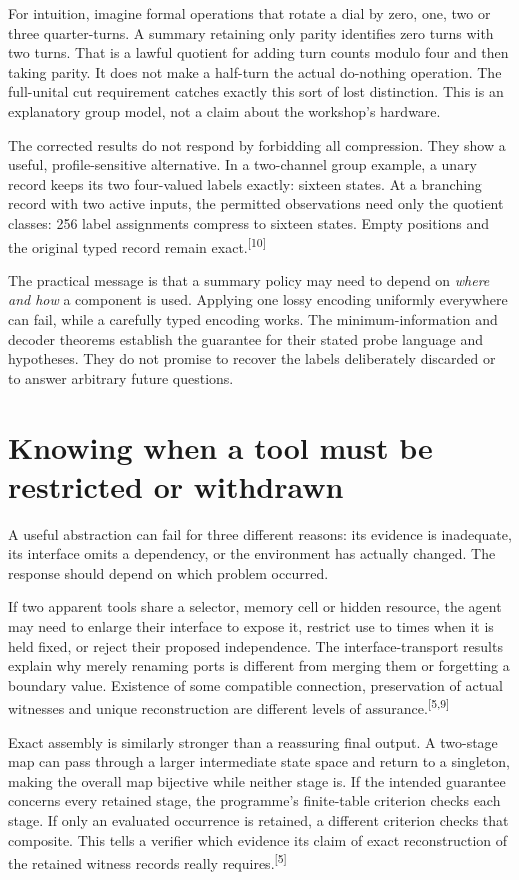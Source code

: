 \documentclass[11pt]{article}
\newcommand{\sn}[1]{\textsuperscript{[#1]}}
\begin{document}
For intuition, imagine formal operations that rotate a dial by zero, one, two or three quarter-turns. A summary retaining only parity identifies zero turns with two turns. That is a lawful quotient for adding turn counts modulo four and then taking parity. It does not make a half-turn the actual do-nothing operation. The full-unital cut requirement catches exactly this sort of lost distinction. This is an explanatory group model, not a claim about the workshop's hardware.

The corrected results do not respond by forbidding all compression. They show a useful, profile-sensitive alternative. In a two-channel group example, a unary record keeps its two four-valued labels exactly: sixteen states. At a branching record with two active inputs, the permitted observations need only the quotient classes: 256 label assignments compress to sixteen states. Empty positions and the original typed record remain exact.\sn{10}

The practical message is that a summary policy may need to depend on \emph{where and how} a component is used. Applying one lossy encoding uniformly everywhere can fail, while a carefully typed encoding works. The minimum-information and decoder theorems establish the guarantee for their stated probe language and hypotheses. They do not promise to recover the labels deliberately discarded or to answer arbitrary future questions.

\section{Knowing when a tool must be restricted or withdrawn}

A useful abstraction can fail for three different reasons: its evidence is inadequate, its interface omits a dependency, or the environment has actually changed. The response should depend on which problem occurred.

If two apparent tools share a selector, memory cell or hidden resource, the agent may need to enlarge their interface to expose it, restrict use to times when it is held fixed, or reject their proposed independence. The interface-transport results explain why merely renaming ports is different from merging them or forgetting a boundary value. Existence of some compatible connection, preservation of actual witnesses and unique reconstruction are different levels of assurance.\sn{5,9}

Exact assembly is similarly stronger than a reassuring final output. A two-stage map can pass through a larger intermediate state space and return to a singleton, making the overall map bijective while neither stage is. If the intended guarantee concerns every retained stage, the programme's finite-table criterion checks each stage. If only an evaluated occurrence is retained, a different criterion checks that composite. This tells a verifier which evidence its claim of exact reconstruction of the retained witness records really requires.\sn{5}
\end{document}
